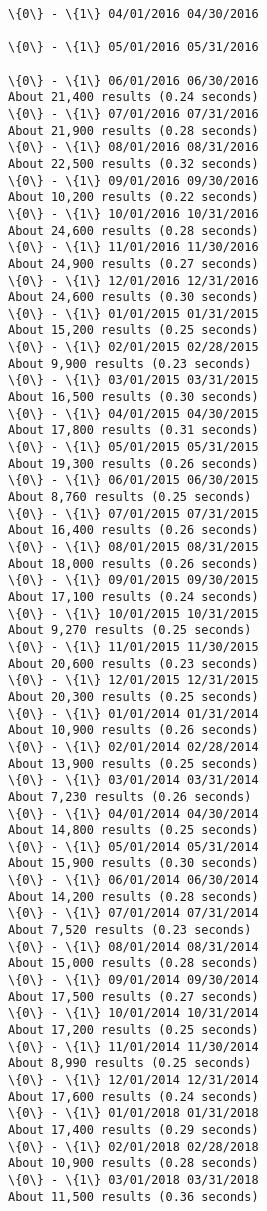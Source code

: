 \documentclass[11pt]{article}
\begin{document}
\begin{Verbatim}[commandchars=\\\{\}]
\{0\} - \{1\} 04/01/2016 04/30/2016

\{0\} - \{1\} 05/01/2016 05/31/2016

\{0\} - \{1\} 06/01/2016 06/30/2016
About 21,400 results (0.24 seconds) 
\{0\} - \{1\} 07/01/2016 07/31/2016
About 21,900 results (0.28 seconds) 
\{0\} - \{1\} 08/01/2016 08/31/2016
About 22,500 results (0.32 seconds) 
\{0\} - \{1\} 09/01/2016 09/30/2016
About 10,200 results (0.22 seconds) 
\{0\} - \{1\} 10/01/2016 10/31/2016
About 24,600 results (0.28 seconds) 
\{0\} - \{1\} 11/01/2016 11/30/2016
About 24,900 results (0.27 seconds) 
\{0\} - \{1\} 12/01/2016 12/31/2016
About 24,600 results (0.30 seconds) 
\{0\} - \{1\} 01/01/2015 01/31/2015
About 15,200 results (0.25 seconds) 
\{0\} - \{1\} 02/01/2015 02/28/2015
About 9,900 results (0.23 seconds) 
\{0\} - \{1\} 03/01/2015 03/31/2015
About 16,500 results (0.30 seconds) 
\{0\} - \{1\} 04/01/2015 04/30/2015
About 17,800 results (0.31 seconds) 
\{0\} - \{1\} 05/01/2015 05/31/2015
About 19,300 results (0.26 seconds) 
\{0\} - \{1\} 06/01/2015 06/30/2015
About 8,760 results (0.25 seconds) 
\{0\} - \{1\} 07/01/2015 07/31/2015
About 16,400 results (0.26 seconds) 
\{0\} - \{1\} 08/01/2015 08/31/2015
About 18,000 results (0.26 seconds) 
\{0\} - \{1\} 09/01/2015 09/30/2015
About 17,100 results (0.24 seconds) 
\{0\} - \{1\} 10/01/2015 10/31/2015
About 9,270 results (0.25 seconds) 
\{0\} - \{1\} 11/01/2015 11/30/2015
About 20,600 results (0.23 seconds) 
\{0\} - \{1\} 12/01/2015 12/31/2015
About 20,300 results (0.25 seconds) 
\{0\} - \{1\} 01/01/2014 01/31/2014
About 10,900 results (0.26 seconds) 
\{0\} - \{1\} 02/01/2014 02/28/2014
About 13,900 results (0.25 seconds) 
\{0\} - \{1\} 03/01/2014 03/31/2014
About 7,230 results (0.26 seconds) 
\{0\} - \{1\} 04/01/2014 04/30/2014
About 14,800 results (0.25 seconds) 
\{0\} - \{1\} 05/01/2014 05/31/2014
About 15,900 results (0.30 seconds) 
\{0\} - \{1\} 06/01/2014 06/30/2014
About 14,200 results (0.28 seconds) 
\{0\} - \{1\} 07/01/2014 07/31/2014
About 7,520 results (0.23 seconds) 
\{0\} - \{1\} 08/01/2014 08/31/2014
About 15,000 results (0.28 seconds) 
\{0\} - \{1\} 09/01/2014 09/30/2014
About 17,500 results (0.27 seconds) 
\{0\} - \{1\} 10/01/2014 10/31/2014
About 17,200 results (0.25 seconds) 
\{0\} - \{1\} 11/01/2014 11/30/2014
About 8,990 results (0.25 seconds) 
\{0\} - \{1\} 12/01/2014 12/31/2014
About 17,600 results (0.24 seconds) 
\{0\} - \{1\} 01/01/2018 01/31/2018
About 17,400 results (0.29 seconds) 
\{0\} - \{1\} 02/01/2018 02/28/2018
About 10,900 results (0.28 seconds) 
\{0\} - \{1\} 03/01/2018 03/31/2018
About 11,500 results (0.36 seconds) 

\end{Verbatim}
\end{document}
